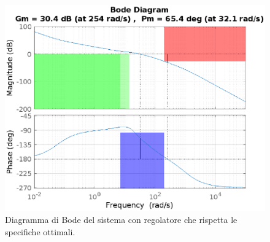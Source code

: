 \documentclass[a4paper]{article}
\begin{document}
\begin{figure}[h!]
    \centering
    \includegraphics[width=\textwidth]{bode_L}
    \caption{Diagramma di Bode del sistema con regolatore che rispetta le specifiche ottimali.}
    \label{fig:bode_L}
\end{figure}
\end{document}
